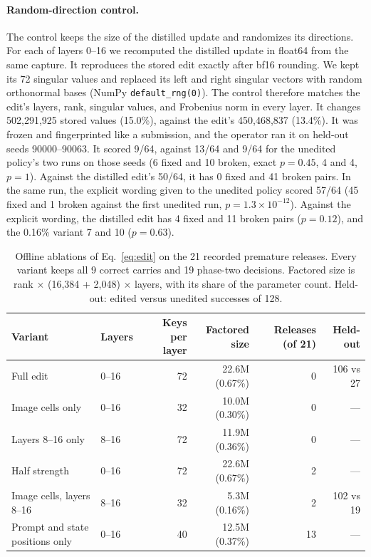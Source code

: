 \documentclass{article}
\begin{document}
\paragraph{Random-direction control.} The control keeps the size of the distilled update and randomizes its directions. For each of layers 0--16 we recomputed the distilled update in float64 from the same capture. It reproduces the stored edit exactly after bf16 rounding. We kept its 72 singular values and replaced its left and right singular vectors with random orthonormal bases (NumPy \texttt{default\_rng(0)}). The control therefore matches the edit's layers, rank, singular values, and Frobenius norm in every layer. It changes 502,291,925 stored values (15.0\%), against the edit's 450,468,837 (13.4\%). It was frozen and fingerprinted like a submission, and the operator ran it on held-out seeds 90000--90063. It scored 9/64, against 13/64 and 9/64 for the unedited policy's two runs on those seeds (6 fixed and 10 broken, exact $p=0.45$, 4 and 4, $p=1$). Against the distilled edit's 50/64, it has 0 fixed and 41 broken pairs. In the same run, the explicit wording given to the unedited policy scored 57/64 (45 fixed and 1 broken against the first unedited run, $p=1.3\times10^{-12}$). Against the explicit wording, the distilled edit has 4 fixed and 11 broken pairs ($p=0.12$), and the 0.16\% variant 7 and 10 ($p=0.63$).

\begin{table}[htbp]
\centering\small
\caption{Offline ablations of Eq.~\eqref{eq:edit} on the 21 recorded premature releases. Every variant keeps all 9 correct carries and 19 phase-two decisions. Factored size is rank $\times$ (16{,}384 + 2{,}048) $\times$ layers, with its share of the parameter count. Held-out: edited versus unedited successes of 128.}
\label{tab:ablation}
\setlength{\tabcolsep}{5pt}
\begin{tabular}{@{}llrrrr@{}}
\toprule
Variant & Layers & Keys per layer & Factored size & Releases (of 21) & Held-out\\
\midrule
Full edit & 0--16 & 72 & 22.6M (0.67\%) & 0 & 106 vs 27\\
Image cells only & 0--16 & 32 & 10.0M (0.30\%) & 0 & ---\\
Layers 8--16 only & 8--16 & 72 & 11.9M (0.36\%) & 0 & ---\\
Half strength & 0--16 & 72 & 22.6M (0.67\%) & 2 & ---\\
Image cells, layers 8--16 & 8--16 & 32 & 5.3M (0.16\%) & 2 & 102 vs 19\\
Prompt and state positions only & 0--16 & 40 & 12.5M (0.37\%) & 13 & ---\\
\bottomrule
\end{tabular}
\end{table}
\end{document}
